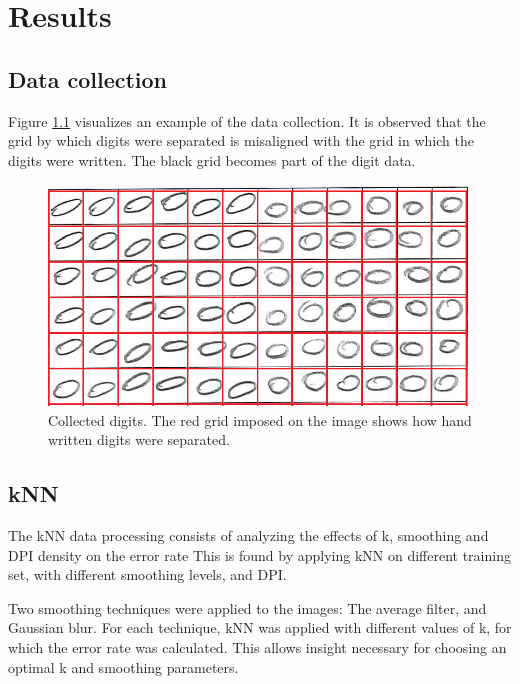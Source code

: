 \chapter{Results}
\section{Data collection}

Figure \ref{fig:misalignment} visualizes an example of the data collection.
It is observed that the grid by which digits were separated is misaligned with the grid
in which the digits were written. The black grid becomes part of the digit data.
\begin{figure}[H]
\centering
\includegraphics[width  =\textwidth]{figure/kiddi-01-grid-nosmooth-300dpi_cut.png}
\caption{Collected digits. The red grid imposed on the image shows how hand written digits were separated.}
\label{fig:misalignment}
\end{figure}

\section{kNN}
The kNN data processing consists of analyzing the effects of k, smoothing and
DPI density on the error rate  This is found by applying kNN on different training set,
with different smoothing levels, and DPI.

Two smoothing techniques were applied to the images: The average filter, and Gaussian blur.  
For each technique, kNN was applied with different values of k, for which the error rate was calculated.
This allows insight necessary for choosing an optimal k and smoothing parameters.



